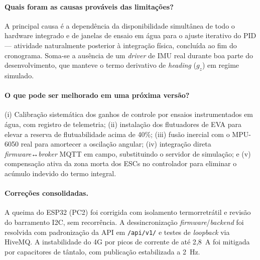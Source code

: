 \documentclass[12pt,a4paper]{article}
\begin{document}
\paragraph{Quais foram as causas prováveis das limitações?} A principal causa é a dependência da disponibilidade simultânea de todo o hardware integrado e de janelas de ensaio em água para o ajuste iterativo do PID — atividade naturalmente posterior à integração física, concluída ao fim do cronograma. Soma-se a ausência de um \textit{driver} de IMU real durante boa parte do desenvolvimento, que manteve o termo derivativo de \textit{heading} ($g_z$) em regime simulado.

\paragraph{O que pode ser melhorado em uma próxima versão?} (i) Calibração sistemática dos ganhos de controle por ensaios instrumentados em água, com registro de telemetria; (ii) instalação dos flutuadores de EVA para elevar a reserva de flutuabilidade acima de 40\%; (iii) fusão inercial com o MPU-6050 real para amortecer a oscilação angular; (iv) integração direta \textit{firmware}↔\textit{broker} MQTT em campo, substituindo o servidor de simulação; e (v) compensação ativa da zona morta dos ESCs no controlador para eliminar o acúmulo indevido do termo integral.

\paragraph{Correções consolidadas.} A queima do ESP32 (PC2) foi corrigida com isolamento termorretrátil e revisão do barramento I2C, sem recorrência. A dessincronização \textit{firmware}/\textit{backend} foi resolvida com padronização da API em \texttt{/api/v1/} e testes de \textit{loopback} via HiveMQ. A instabilidade do 4G por picos de corrente de até 2{,}8~A foi mitigada por capacitores de tântalo, com publicação estabilizada a 2~Hz.
\end{document}
